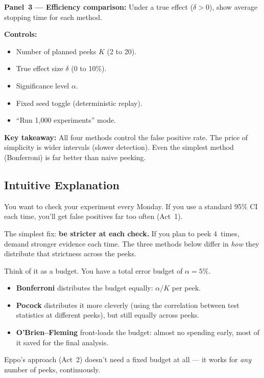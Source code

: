 \documentclass[12pt, a4paper]{article}
\begin{document}
\begin{simulation}
\textbf{Panel~3 --- Efficiency comparison:}
Under a true effect ($\delta > 0$), show average stopping time for each
method.

\textbf{Controls:}
\begin{itemize}[nosep]
  \item Number of planned peeks $K$ (2 to 20).
  \item True effect size $\delta$ (0 to 10\%).
  \item Significance level $\alpha$.
  \item Fixed seed toggle (deterministic replay).
  \item ``Run 1{,}000 experiments'' mode.
\end{itemize}

\textbf{Key takeaway:}
All four methods control the false positive rate.  The price of simplicity
is wider intervals (slower detection).  Even the simplest method
(Bonferroni) is far better than naive peeking.
\end{simulation}


\subsection{Intuitive Explanation}

\begin{intuition}
You want to check your experiment every Monday.  If you use a standard
95\% CI each time, you'll get false positives far too often (Act~1).

The simplest fix: \textbf{be stricter at each check.}  If you plan to peek
4~times, demand stronger evidence each time.  The three methods below
differ in \emph{how} they distribute that strictness across the peeks.

Think of it as a budget.  You have a total error budget of $\alpha = 5\%$.
\begin{itemize}[nosep]
  \item \textbf{Bonferroni} distributes the budget equally:
        $\alpha/K$ per peek.
  \item \textbf{Pocock} distributes it more cleverly (using the correlation
        between test statistics at different peeks), but still equally across
        peeks.
  \item \textbf{O'Brien--Fleming} front-loads the budget: almost no spending
        early, most of it saved for the final analysis.
\end{itemize}

Eppo's approach (Act~2) doesn't need a fixed budget at all --- it works
for \emph{any} number of peeks, continuously.
\end{intuition}
\end{document}
